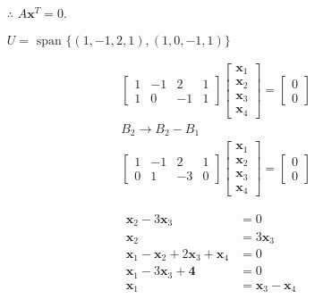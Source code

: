 \documentclass[12pt, a4paper]{scrartcl}
\begin{document}
\begin{enumerate}
\begin{enumerate}
                \begin{itemize}
                    \item[$\therefore$] $A\textbf{x}^T = 0$.
                \end{itemize}

                \begin{itemize}
                    \item[] $U= \mbox{ span }\{(1,-1,2,1),(1,0,-1,1)\}$
                \end{itemize}

                \begin{align*}
                    &\begin{bmatrix}
                        1 & -1 & 2 & 1\\1 & 0 & -1 & 1
                    \end{bmatrix} \begin{bmatrix}
                        \textbf{x}_1 \\ \textbf{x}_2 \\ \textbf{x}_3 \\ \textbf{x}_4
                    \end{bmatrix} = \begin{bmatrix}
                        0 \\ 0
                    \end{bmatrix}
                    \\ &B_2 \to B_2 - B_1
                    \\ &\begin{bmatrix}
                        1 & -1 & 2 & 1 \\ 0 & 1 & -3 & 0
                    \end{bmatrix} \begin{bmatrix}
                        \textbf{x}_1 \\ \textbf{x}_2 \\ \textbf{x}_3 \\ \textbf{x}_4
                    \end{bmatrix} = \begin{bmatrix}
                        0 \\ 0
                    \end{bmatrix}
                \end{align*}

                \begin{align*}
                    \textbf{x}_2 - 3\textbf{x}_3 &= 0
                    \\ \textbf{x}_2 &= 3\textbf{x}_3
                    \\ \textbf{x}_1 - \textbf{x}_2 + 2\textbf{x}_3 + \textbf{x}_4 &= 0
                    \\ \textbf{x}_1 - 3\textbf{x}_3 + \textbf{4} &= 0
                    \\ \textbf{x}_1 &= \textbf{x}_3 - \textbf{x}_4
                \end{align*}


\end{enumerate}
\end{enumerate}
\end{document}
